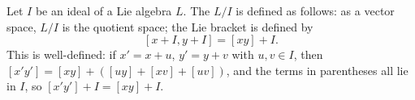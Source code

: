 Let $I$ be an ideal of a Lie algebra $L$. The  $L/I$ is defined as follows: as a vector space, $L/I$ is the quotient space; the Lie bracket is defined by
$$[x+I, y+I] = [xy] + I.$$
This is well-defined: if $x' = x+u$, $y' = y+v$ with $u, v \in I$, then $[x'y'] = [xy] + ([uy] + [xv] + [uv])$, and the terms in parentheses all lie in $I$, so $[x'y'] + I = [xy] + I$.
